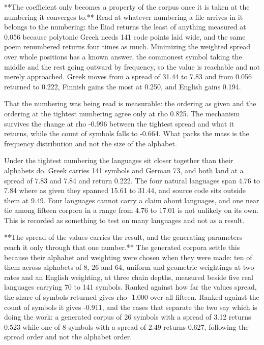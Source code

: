 **The coefficient only becomes a property of the corpus once it is taken at the numbering it converges to.** Read at whatever numbering a file arrives in it belongs to the numbering: the Iliad returns the least of anything measured at 0.056 because polytonic Greek needs 141 code points laid wide, and the same poem renumbered returns four times as much. Minimizing the weighted spread over whole positions has a known answer, the commonest symbol taking the middle and the rest going outward by frequency, so the value is reachable and not merely approached. Greek moves from a spread of 31.44 to 7.83 and from 0.056 returned to 0.222, Finnish gains the most at 0.250, and English gains 0.194.

That the numbering was being read is measurable: the ordering as given and the ordering at the tightest numbering agree only at rho 0.825. The mechanism survives the change at rho -0.996 between the tightest spread and what it returns, while the count of symbols falls to -0.664. What packs the mass is the frequency distribution and not the size of the alphabet.

Under the tightest numbering the languages sit closer together than their alphabets do. Greek carries 141 symbols and German 73, and both land at a spread of 7.83 and 7.84 and return 0.222. The four natural languages span 4.76 to 7.84 where as given they spanned 15.61 to 31.44, and source code sits outside them at 9.49. Four languages cannot carry a claim about languages, and one near tie among fifteen corpora in a range from 4.76 to 17.01 is not unlikely on its own. This is recorded as something to test on many languages and not as a result.

**The spread of the values carries the result, and the generating parameters reach it only through that one number.** The generated corpora settle this because their alphabet and weighting were chosen when they were made: ten of them across alphabets of 8, 26 and 64, uniform and geometric weightings at two rates and an English weighting, at three chain depths, measured beside five real languages carrying 70 to 141 symbols. Ranked against how far the values spread, the share of symbols returned gives rho -1.000 over all fifteen. Ranked against the count of symbols it gives -0.911, and the cases that separate the two say which is doing the work: a generated corpus of 26 symbols with a spread of 3.12 returns 0.523 while one of 8 symbols with a spread of 2.49 returns 0.627, following the spread order and not the alphabet order.

